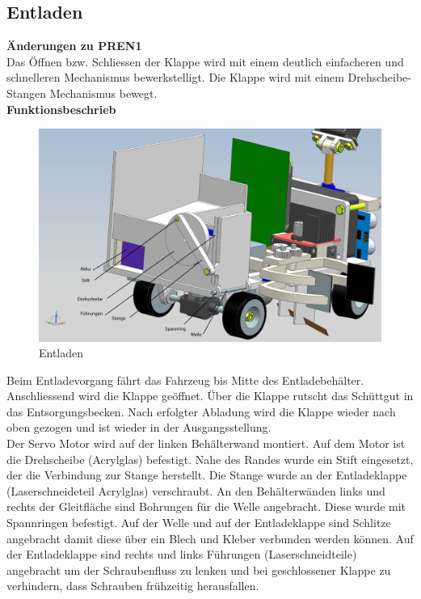 \subsection{Entladen}
\textbf{Änderungen zu PREN1}\\[0.2cm]
Das Öffnen bzw. Schliessen der Klappe wird mit einem deutlich einfacheren und schnelleren Mechanismus bewerkstelligt. Die Klappe wird mit einem Drehscheibe-Stangen Mechanismus bewegt.\\[0.2cm]
\textbf{Funktionsbeschrieb}\\[0.2cm]
\begin{figure}[H]
\centering
\includegraphics[width=1\textwidth]{03_Loesungskonzept/pictures/entladen12.png}
\caption{Entladen}
\end{figure}
Beim Entladevorgang fährt das Fahrzeug bis Mitte des Entladebehälter. Anschliessend wird die Klappe geöffnet. Über die Klappe rutscht das Schüttgut in das Entsorgungsbecken. Nach erfolgter Abladung wird die Klappe wieder nach oben gezogen und ist wieder in der Ausgangsstellung.\\[0.2cm]
Der Servo Motor wird auf der linken Behälterwand montiert. Auf dem Motor ist die Drehscheibe (Acrylglas) befestigt. Nahe des Randes wurde ein Stift eingesetzt, der die Verbindung zur Stange herstellt. Die Stange wurde an der Entladeklappe (Laserschneideteil Acrylglas) verschraubt.
An den Behälterwänden links und rechts der Gleitfläche sind Bohrungen für die Welle angebracht. Diese wurde mit Spannringen befestigt. Auf der Welle und auf der Entladeklappe sind Schlitze angebracht damit diese über ein Blech und Kleber verbunden werden können.
Auf der Entladeklappe sind rechts und links Führungen (Laserschneidteile) angebracht um der Schraubenfluss zu lenken und bei geschlossener Klappe zu verhindern, dass Schrauben frühzeitig herausfallen.